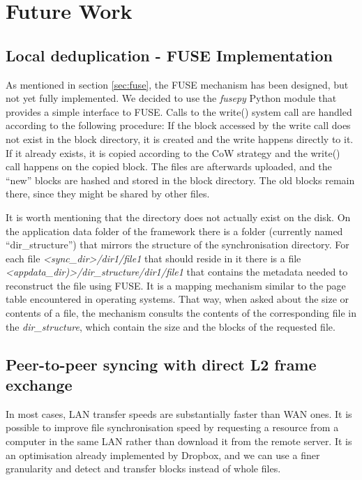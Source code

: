
\chapter{Future Work}
\label{cha:future-work}
\section{Local deduplication - FUSE Implementation}
As mentioned in section \ref{sec:fuse}, the FUSE mechanism has been designed, but not yet fully implemented. We decided to use the \emph{fusepy} Python module that provides a simple interface to FUSE. Calls to the write() system call are handled according to the following procedure: If the block accessed by the write call does not exist in the block directory, it is created and the write happens directly to it. If it already exists, it is copied according to the CoW strategy and the write() call happens on the copied block. The files are afterwards uploaded, and the ``new'' blocks are hashed and stored in the block directory. The old blocks remain there, since they might be shared by other files.

It is worth mentioning that the directory does not actually exist on the disk. On the application data folder of the framework there is a folder (currently named ``dir\_structure'') that mirrors the structure of the synchronisation directory. For each file \emph{<sync\_dir>/dir1/file1} that should reside in it there is a file \emph{<appdata\_dir)>/dir\_structure/dir1/file1} that contains the metadata needed to reconstruct the file using FUSE. It is a mapping mechanism similar to the page table encountered in operating systems. That way, when asked about the size or contents of a file, the mechanism consults the contents of the corresponding file in the \emph{dir\_structure}, which contain the size and the blocks of the requested file.

\section{Peer-to-peer syncing with direct L2 frame exchange}
In most cases, LAN transfer speeds are substantially faster than WAN ones. It is possible to improve file synchronisation speed by requesting a resource from a computer in the same LAN rather than download it from the remote server. It is an optimisation already implemented by Dropbox, and we can use a finer granularity and detect and transfer blocks instead of whole files.

